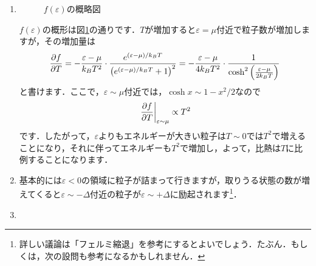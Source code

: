 \documentclass[a4paper,pdflatex,ja=standard]{bxjsarticle}
\begin{document}
\begin{enumerate}
  \item 
  
  \begin{figure}[ht]
    \centering    
    \caption{$f(\varepsilon)$の概略図}
    \label{fermi_dist}
  \end{figure}

  $f(\varepsilon)$の概形は図\ref{fermi_dist}の通りです．$T$が増加すると$\varepsilon=\mu$付近で粒子数が増加しますが，その増加量は 
  \begin{equation}
    \pdv{f}{T}
    =
    -
    \frac{\varepsilon-\mu}{k_BT^2}
    \cdot
    \frac{e^{(\varepsilon-\mu)/k_BT}}{\left( e^{(\varepsilon-\mu)/k_BT}+1 \right)^2}
    =
    -
    \frac{\varepsilon-\mu}{4k_BT^2}
    \cdot
    \frac{1}{\cosh^2\left( \frac{\varepsilon-\mu}{2k_BT} \right)}
  \end{equation}
  と書けます．ここで，$\varepsilon\sim\mu$付近では，$\cosh x\sim 1-x^2/2$なので
  \begin{equation}
    \left.
      \pdv{f}{T}
    \right|_{\varepsilon\sim\mu}
    \propto
    T^2
  \end{equation}
  です．したがって，$\varepsilon$よりもエネルギーが大きい粒子は$T\sim0$では$T^2$で増えることになり，それに伴ってエネルギーも$T^2$で増加し，よって，比熱は$T$に比例することになります．


  \item

  基本的には$\varepsilon<0$の領域に粒子が詰まって行きますが，取りうる状態の数が増えてくると$\varepsilon\sim -\Delta$付近の粒子が$\varepsilon\sim+\Delta$に励起されます\footnote{
    詳しい議論は「フェルミ縮退」を参考にするとよいでしょう．たぶん．もしくは，次の設問も参考になるかもしれません．
  }．


  \item


\end{enumerate}
\end{document}
